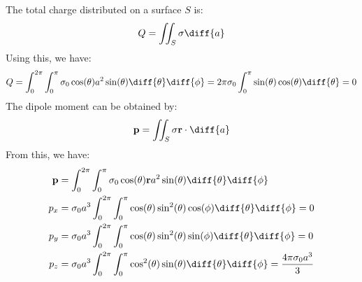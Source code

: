                 \begin{solution}
                    The total charge distributed on a surface $S$ is:
                    \begin{equation}
                        Q=\iint_{S}\sigma\diff{a}
                    \end{equation}
                    Using this, we have:
                    \begin{equation}
                        Q=\int_{0}^{2\pi}\int_{0}^{\pi}
                        \sigma_{0}\cos(\theta)a^{2}\sin(\theta)
                        \diff{\theta}\diff{\phi}
                        =2\pi\sigma_{0}\int_{0}^{\pi}
                        \sin(\theta)\cos(\theta)\diff{\theta}
                        =0
                    \end{equation}
                    The dipole moment can be obtained by:
                    \begin{equation}
                        \mathbf{p}=\iint_{S}\sigma\mathbf{r}\cdot\diff{a}
                    \end{equation}
                    From this, we have:
                    \begin{subequations}
                        \begin{align}
                            \mathbf{p}&=
                            \int_{0}^{2\pi}\int_{0}^{\pi}
                            \sigma_{0}\cos(\theta)
                                \mathbf{r}a^{2}\sin(\theta)
                                \diff{\theta}\diff{\phi}\\
                            p_{x}&=
                            \sigma_{0}a^{3}\int_{0}^{2\pi}\int_{0}^{\pi}
                                \cos(\theta)\sin^{2}(\theta)\cos(\phi)
                                \diff{\theta}\diff{\phi}=0\\
                            p_{y}&=\sigma_{0}a^{3}
                                \int_{0}^{2\pi}\int_{0}^{\pi}
                                \cos(\theta)\sin^{2}(\theta)\sin(\phi)
                                \diff{\theta}\diff{\phi}=0\\
                            p_{z}&=\sigma_{0}a^{3}
                                \int_{0}^{2\pi}\int_{0}^{\pi}
                                \cos^{2}(\theta)\sin(\theta)
                                \diff{\theta}\diff{\phi}
                                =\frac{4\pi\sigma_{0}a^{3}}{3}
                        \end{align}
                    \end{subequations}

\end{solution}
